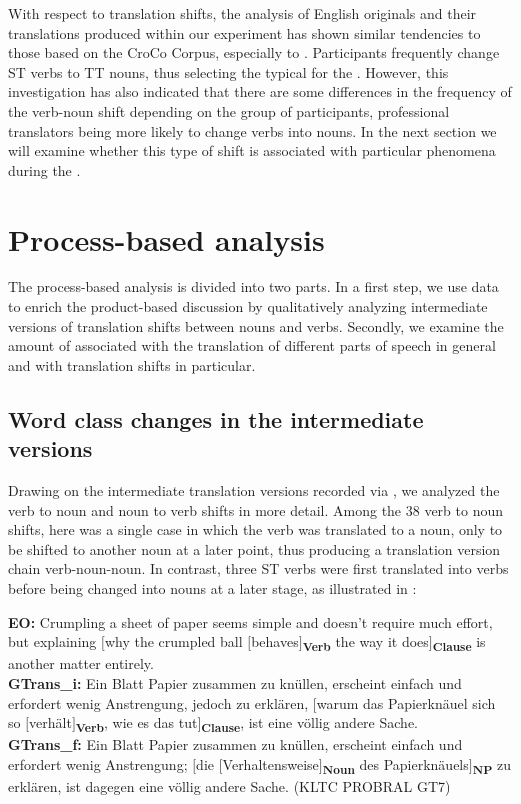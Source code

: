 \documentclass[output=paper]{LSP/langsci}
\begin{document}
With respect to translation shifts, the analysis of English originals and their  translations produced within our experiment has shown similar tendencies to those based on the CroCo Corpus, especially to \citet{Culo2008}. Participants frequently change ST verbs to TT nouns, thus selecting the  typical for the . However, this investigation has also indicated that there are some differences in the frequency of the verb-noun shift depending on the group of participants, professional translators being more likely to change verbs into nouns. In the next section we will examine whether this type of shift is associated with particular phenomena during the .

\section{Process-based analysis}\label{serbinaetal:sec:5}
The process-based analysis is divided into two parts. In a first step, we use  data to enrich the product-based discussion by qualitatively analyzing intermediate versions of translation shifts between nouns and verbs. Secondly, we examine the amount of  associated with the translation of different parts of speech in general and with translation shifts in particular. 

\largerpage[-1]%
\subsection{Word class changes in the intermediate versions}\label{serbinaetal:sec:5:1}
Drawing on the intermediate translation versions recorded  via , we analyzed the verb to noun and noun to verb shifts in more detail. Among the 38 verb to noun shifts, here was a single case in which the verb was translated to a noun, only to be shifted to another noun at a later point, thus producing a translation version chain verb-noun-noun. In contrast, three ST verbs were first translated into verbs before being changed into nouns at a later stage, as illustrated in :

\ea \label{serbinaetal:ex:10}
\textbf{EO:} Crumpling a sheet of paper seems simple and doesn't require much effort, but explaining $[$why the crumpled ball $[$behaves$]$\textsubscript{\textbf{Verb}} the way it does$]$\textsubscript{\textbf{Clause}} is another matter entirely. \\
\textbf{GTrans\_i:} Ein Blatt Papier zusammen zu knüllen, erscheint einfach und erfordert wenig Anstrengung, jedoch zu erklären, $[$warum das Papierknäuel sich so $[$verhält$]$\textsubscript{\textbf{Verb}}, wie es das tut$]$\textsubscript{\textbf{Clause}}, ist eine völlig andere Sache. \\
\textbf{GTrans\_f:} Ein Blatt Papier zusammen zu knüllen, erscheint einfach und erfordert wenig Anstrengung; $[$die $[$Verhaltensweise$]$\textsubscript{\textbf{Noun}} des Papierknäuels$]$\textsubscript{\textbf{NP}} zu erklären, ist dagegen eine völlig andere Sache. (KLTC PROBRAL GT7)
\z
\end{document}
